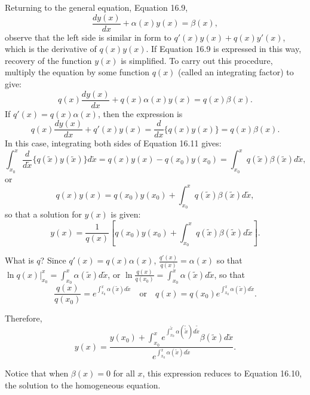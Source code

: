 \begin{original}
Returning to the general equation, Equation 16.9,
\[
\frac{d y(x)}{dx} + \alpha(x)y(x) = \beta(x),
\]
observe that the left side is similar in form to $q'(x)y(x) + q(x)y'(x)$, which is the derivative of $q(x)y(x)$. If Equation 16.9 is expressed in this way, recovery of the function $y(x)$ is simplified. To carry out this procedure, multiply the equation by some function $q(x)$ (called an integrating factor) to give:
\[
q(x)\frac{d y(x)}{dx} + q(x)\alpha(x)y(x) = q(x)\beta(x).
\]
If $q'(x) = q(x)\alpha(x)$, then the expression is
\[
q(x)\frac{d y(x)}{dx} + q'(x)y(x) = \frac{d}{dx}\{q(x)y(x)\} = q(x)\beta(x). \tag{16.11}
\]
In this case, integrating both sides of Equation 16.11 gives:
\[
\int_{x_0}^{x} \frac{d}{d\tilde{x}}\{q(\tilde{x})y(\tilde{x})\} d\tilde{x} = q(x) y(x) - q(x_0) y(x_0) = \int_{x_0}^{x} q(\tilde{x})\beta(\tilde{x}) d\tilde{x}, \tag{16.12}
\]
or
\[
q(x)y(x) = q(x_0)y(x_0) + \int_{x_0}^{x} q(\tilde{x})\beta(\tilde{x}) d\tilde{x}, \tag{16.13}
\]
so that a solution for $y(x)$ is given:
\[
y(x) = \frac{1}{q(x)}\left[q(x_0)y(x_0) + \int_{x_0}^{x} q(\tilde{x})\beta(\tilde{x}) d\tilde{x}\right]. \tag{16.14}
\]

What is $q$? Since $q'(x) = q(x)\alpha(x)$, $\frac{q'(x)}{q(x)} = \alpha(x)$ so that $\ln q(x)\big|_{x_0}^{x} = \int_{x_0}^{x} \alpha(\tilde{x}) d\tilde{x}$, or $\ln\frac{q(x)}{q(x_0)} = \int_{x_0}^{x} \alpha(\tilde{x}) d\tilde{x}$, so that
\[
\frac{q(x)}{q(x_0)} = e^{\int_{x_0}^{x} \alpha(\tilde{x}) d\tilde{x}} \quad \text{or} \quad q(x) = q(x_0)e^{\int_{x_0}^{x} \alpha(\tilde{x}) d\tilde{x}}.
\]

Therefore,
\[
y(x) = \frac{y(x_0) + \int_{x_0}^{x} e^{\int_{x_0}^{\tilde{x}} \alpha(\tilde{\tilde{x}}) d\tilde{\tilde{x}}} \beta(\tilde{x}) d\tilde{x}}{e^{\int_{x_0}^{x} \alpha(\tilde{x}) d\tilde{x}}}. \tag{16.15}
\]

Notice that when $\beta(x) = 0$ for all $x$, this expression reduces to Equation 16.10, the solution to the homogeneous equation.
\end{original}
